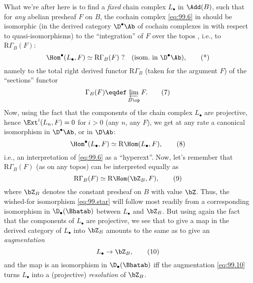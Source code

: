 What we're after here is to find a \emph{fixed} chain complex
$L_\bullet$ in $\Add(B)$, such that for \emph{any} abelian presheaf
$F$ on $B$, the cochain complex \eqref{eq:99.6} in \Ab{} should be
isomorphic (in the derived category $\D^\bullet\Ab$ of cochain
complexes in \Ab{} with respect to quasi-isomorphisms) to the
``integration'' of $F$ over the topos \Bhat, i.e., to $\mathrm
R\Gamma_B(F)$:
\begin{equation}
  \label{eq:99.star}
  \Hom^\bullet(L_\bullet,F)\simeq \mathrm R\Gamma_B(F)\text{
    ?}\quad(\text{isom.\ in $\D^\bullet\Ab$}),\tag{*}
\end{equation}
namely to the total right derived functor $\mathrm R\Gamma_B$ (taken
for the argument $F$) of the ``sections'' functor
\begin{equation}
  \label{eq:99.7}
  \Gamma_B(F) \eqdef \varprojlim_{B\op} F.\tag{7}
\end{equation}
Now, using the fact that the components of the chain complex
$L_\bullet$ are projective, hence $\Ext^i(L_n,F)=0$ for $i>0$ (any
$n$, any $F$), we get at any rate a canonical isomorphism in
$\D^\bullet\Ab$, or in $\D\Ab$:
\begin{equation}
  \label{eq:99.8}
  \Hom^\bullet(L_\bullet,F)\simeq \mathrm R\Hom(L_\bullet,F),\tag{8}
\end{equation}
i.e., an interpretation of \eqref{eq:99.6} as a ``hyperext''. Now,
let's remember that $\mathrm R\Gamma_B(F)$ (as on any topos) can be
interpreted equally as
\begin{equation}
  \label{eq:99.9}
  \mathrm R\Gamma_B(F)\simeq\mathrm R\Hom(\bZ_B,F),\tag{9}
\end{equation}
where $\bZ_B$ denotes the constant presheaf on $B$ with value
$\bZ$. Thus, the wished-for isomorphism \eqref{eq:99.star} will follow
most readily from a corresponding isomorphism in $\D_\bullet(\Bhatab)$
between $L_\bullet$ and $\bZ_B$. But using again the fact that the
components of $L_\bullet$ are projective, we see that to give a map in
the derived category of $L_\bullet$ into $\bZ_B$ amounts to the same
as to give an \emph{augmentation}
\begin{equation}
  \label{eq:99.10}
  L_\bullet\to\bZ_B,\tag{10}
\end{equation}
and the map is an isomorphism in $\D_\bullet(\Bhatab)$
if{f} the augmentation \eqref{eq:99.10} turns $L_\bullet$
into a (projective) \emph{resolution} of $\bZ_B$.

